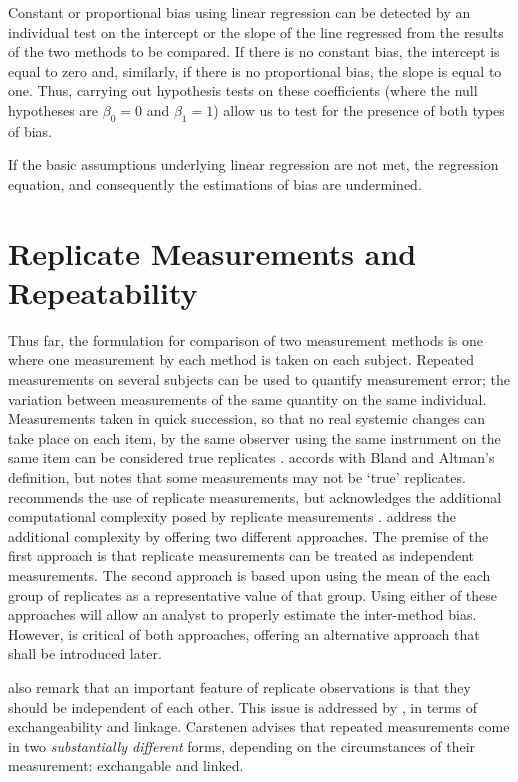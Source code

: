 \documentclass[12pt, a4paper]{report}
\theoremstyle{plain}
\theoremstyle{definition}
\theoremstyle{remark}
\begin{document}
	Constant or proportional bias using linear regression can be detected by an individual test on the intercept or the slope of the line regressed from the results of the two methods to be compared. If there is no constant bias, the intercept is equal to zero and, similarly, if there is no proportional bias, the slope is equal to one. Thus, carrying out hypothesis tests on these coefficients (where the null hypotheses are $\beta_0=0$ and $\beta_1=1$) allow us to test for the presence of both types of bias.

	
		If the basic assumptions underlying linear regression are not met, the regression equation, and consequently the estimations of bias are undermined. 
		

	\section{Replicate Measurements and Repeatability}
Thus far, the formulation for comparison of two measurement
methods is one where one measurement by each method is taken on
each subject. Repeated measurements on several subjects can be used to quantify measurement error; the variation between measurements of the same quantity on the same individual. Measurements taken in quick succession, so that no real systemic changes can take place on each item,  by the same observer using the same instrument on the same item can be considered true replicates \citep{BA99}. \citet{ARoy2009} accords with Bland and Altman's definition, but notes that some measurements may not be `true' replicates.
 \citet{BXC2008} recommends the use of replicate measurements, but acknowledges the additional computational complexity posed by replicate measurements . \citet*{BA86} address the additional complexity by offering two different approaches. The premise of the first approach is that replicate measurements can be treated as independent measurements. The second approach is based upon using the mean of the each group of
		replicates as a representative value of that group. Using either of these approaches will allow an analyst to properly estimate the inter-method bias. However, \citet{BXC2008} is critical of both approaches, offering an alternative approach that shall be introduced later.
		
\citet{BA99} also remark that an important feature of replicate observations is that they should be independent
of each other. This issue is addressed by \citet{BXC2010}, in terms of exchangeability and linkage. Carstenen advises that repeated measurements come in two \emph{substantially different} forms, depending on the circumstances of their measurement: exchangable and linked.
		
\end{document}
